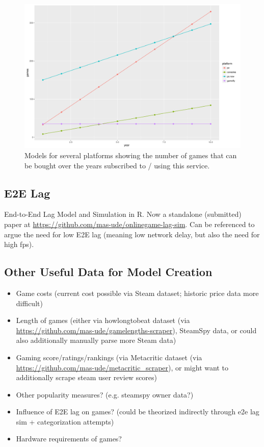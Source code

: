 \begin{figure}[!t]
	\centering
	\includegraphics[width=1.0\columnwidth]{images/games-over-year.pdf}
	\caption{Models for several platforms showing the number of games that can be bought over the years subscribed to / using this service.}
\label{fig:games-over-years}
\end{figure}


\subsection{E2E Lag}
End-to-End Lag Model and Simulation in R. Now a standalone (submitted) paper at \url{https://github.com/mas-ude/onlinegame-lag-sim}. Can be referenced to argue the need for low E2E lag (meaning low network delay, but also the need for high fps).



\subsection{Other Useful Data for Model Creation}

\begin{itemize}
	\item Game costs (current cost possible via Steam dataset; historic price data more difficult)
	\item Length of games (either via howlongtobeat dataset (via \url{https://github.com/mas-ude/gamelengths-scraper}), SteamSpy data, or could also additionally manually parse more Steam data)
	\item Gaming score/ratings/rankings (via Metacritic dataset (via \url{https://github.com/mas-ude/metacritic_scraper}), or might want to additionally scrape steam user review scores)
	\item Other popularity measures? (e.g. steamspy owner data?)
	\item Influence of E2E lag on games? (could be theorized indirectly through e2e lag sim + categorization attempts)
	\item Hardware requirements of games?
\end{itemize}


